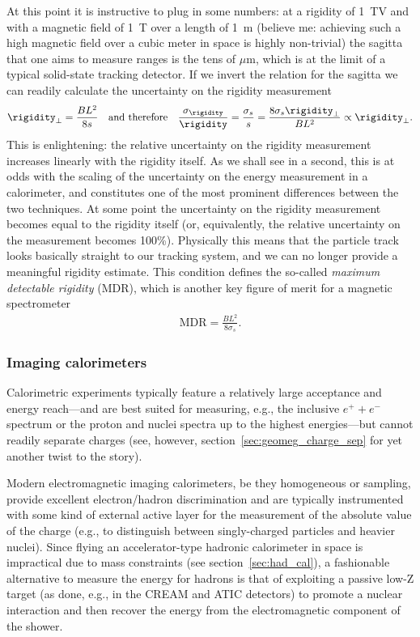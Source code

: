 At this point it is instructive to plug in some numbers: at a rigidity of 1~TV
and with a magnetic field of 1~T over a length of 1~m (believe me: achieving such
a high magnetic field over a cubic meter in space is highly non-trivial) the sagitta
that one aims to measure ranges is the tens of $\mu$m, which is at the limit of a
typical solid-state tracking detector. If we invert the relation for the sagitta
we can readily calculate the uncertainty on the rigidity measurement
\begin{align}
  \rigidity_\perp = \frac{B L^2}{8 s} \quad\text{and therefore}\quad
  \frac{\sigma_\rigidity}{\rigidity} = \frac{\sigma_s}{s} =
  \frac{8 \sigma_s \rigidity_\perp}{B L^2} \propto \rigidity_\perp.
\end{align}
This is enlightening: the relative uncertainty on the rigidity measurement increases
linearly with the rigidity itself. As we shall see in a second, this is at odds
with the scaling of the uncertainty on the energy measurement in a calorimeter,
and constitutes one of the most prominent differences between the two techniques.
At some point the uncertainty on the rigidity measurement becomes equal to the
rigidity itself (or, equivalently, the relative uncertainty on the measurement
becomes 100\%). Physically this means that the particle track looks basically straight
to our tracking system, and we can no longer provide a meaningful rigidity estimate.
This condition defines the so-called \emph{maximum detectable rigidity} (MDR),
which is another key figure of merit for a magnetic spectrometer
\begin{align}
  \text{MDR} = \frac{B L^2}{8 \sigma_s}.
\end{align}


\subsubsection{Imaging calorimeters}

Calorimetric experiments typically feature a relatively large acceptance
and energy reach---and are best suited for measuring, e.g., the inclusive $e^+ + e^-$
spectrum or the proton and nuclei spectra up to the highest energies---but cannot
readily separate charges (see, however, section~\ref{sec:geomeg_charge_sep} for
yet another twist to the story).

Modern electromagnetic imaging calorimeters, be they homogeneous or sampling,
provide excellent electron/hadron discrimination and are typically instrumented
with some kind of external active layer for the measurement of the absolute
value of the charge (e.g., to distinguish between singly-charged particles and
heavier nuclei). Since flying an accelerator-type hadronic calorimeter in space
is impractical due to mass constraints (see section~\ref{sec:had_cal}),
a fashionable alternative to measure the energy for hadrons is that of
exploiting a passive low-Z target (as done, e.g., in the CREAM and ATIC
detectors) to promote a nuclear interaction and then recover the energy from
the electromagnetic component of the shower.

